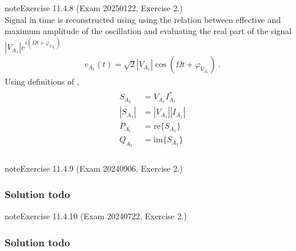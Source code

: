 \documentclass[letterpaper,10pt,english]{jupyterBook}
\begin{document}
\begin{sphinxadmonition}{note}{Exercise 11.4.8 (Exam 2025\sphinxhyphen{}01\sphinxhyphen{}22, Exercise 2.)}
\begin{equation*}
\end{equation*}
\sphinxAtStartPar
Signal in time is reconstructed using using the relation between effective and maximum amplitude of the oscillation and evaluating the real part of the signal \(|V_{A_1}| e^{i(\Omega t + \varphi_{V_{A_1}})}\)
\begin{equation*}
\begin{split}v_{A_1}(t) = \sqrt{2} |V_{A_1}| \cos(\Omega t + \varphi_{V_{A_1}}) \ .\end{split}
\end{equation*}
\sphinxAtStartPar
{} Using definitions of {\hyperref[\detokenize{ch/electrical-engineering-networks-harmonic:classical-electromagnetism-electrical-engineering-newtork-analysis-harmonic-power}]{}},
\begin{equation*}
\begin{split}\begin{aligned}
   S_{A_1}  & = V_{A_1} I_{A_1}^* \\
  |S_{A_1}| & = |V_{A_1}| |I_{A_1}| \\
   P_{A_1}  & = \text{re} \{ S_{A_1} \} \\
   Q_{A_1}  & = \text{im} \{ S_{A_1} \} \\
\end{aligned}\end{split}
\end{equation*}\end{sphinxadmonition}
 \label{exercise:exam-24-09-06-exe-02}

\begin{sphinxadmonition}{note}{Exercise 11.4.9 (Exam 2024\sphinxhyphen{}09\sphinxhyphen{}06, Exercise 2.)}



\begin{figure}[htbp]
\centering

\noindent{}
\end{figure}
\subsubsection*{Solution \sphinxhyphen{} todo}
\end{sphinxadmonition}
 \label{exercise:exam-24-07-22-exe-02}

\begin{sphinxadmonition}{note}{Exercise 11.4.10 (Exam 2024\sphinxhyphen{}07\sphinxhyphen{}22, Exercise 2.)}



\begin{figure}[htbp]
\centering

\noindent{}
\end{figure}
\subsubsection*{Solution \sphinxhyphen{} todo}
\end{sphinxadmonition}
\end{document}
